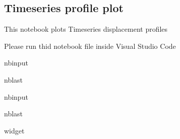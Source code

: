 \documentclass[letterpaper,10pt]{sphinxmanual}
\begin{document}
\sphinxstepscope


\subsection{Time\sphinxhyphen{}series profile plot}
\label{\detokenize{notebooks/akhdefo_ts_plot:Time-series-profile-plot}}\label{\detokenize{notebooks/akhdefo_ts_plot::doc}}
\sphinxAtStartPar
This notebook plots Time\sphinxhyphen{}series displacement profiles

\sphinxAtStartPar
{}

\sphinxAtStartPar
Please run thid notebook file inside Visual Studio Code

\begin{sphinxuseclass}{nbinput}
\begin{sphinxuseclass}{nblast}
{
\begin{sphinxVerbatim}[commandchars=\\\{\}]
\llap{\color{nbsphinxin}[ ]:\,\hspace{\fboxrule}\hspace{\fboxsep}}
    

\end{sphinxVerbatim}
}

\end{sphinxuseclass}
\end{sphinxuseclass}
\begin{sphinxuseclass}{nbinput}
\begin{sphinxuseclass}{nblast}
{
\begin{sphinxVerbatim}[commandchars=\\\{\}]
\llap{\color{nbsphinxin}[1]:\,\hspace{\fboxrule}\hspace{\fboxsep}} widget
   
\end{sphinxVerbatim}
}

\end{sphinxuseclass}
\end{sphinxuseclass}
\end{document}
